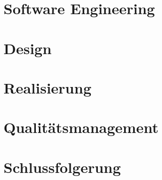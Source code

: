 \documentclass[12pt, a4paper]{report}
\begin{document}
		
	
	
	\chapter{Software Engineering}
		
	
	\chapter{Design}
	
	
	
	
	\chapter{Realisierung}
	
	
	
	
	\chapter{Qualitätsmanagement}
	
	
	
	\chapter{Schlussfolgerung}
	
	
\end{document}
